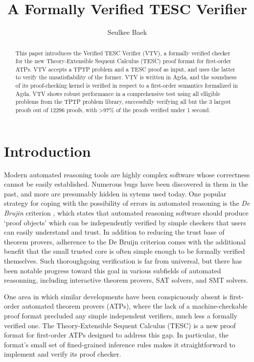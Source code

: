 \documentclass[12pt]{article}
\title{A Formally Verified TESC Verifier}
\author{Seulkee Baek}
\begin{document}
\maketitle

\begin{abstract}

This paper introduces the Verified TESC Verifier (VTV), a formally verified 
checker for the new Theory-Extensible Sequent Calculus (TESC) proof format for first-order ATPs. VTV accepts a
TPTP problem and a TESC proof as input, and uses the latter to verify the 
unsatisfiability of the former. VTV is written in Agda, and the soundness 
of its proof-checking kernel is verified in respect to a first-order
semantics formalized in Agda. VTV shows robust performance in a comprehensive 
test using all elligible problems from the TPTP problem library, 
successfully verifying all but the 3 largest proofs out of 12296 proofs,
with >97\% of the proofs verified under 1 second. 




\end{abstract}


\section{Introduction}

Modern automated reasoning tools are highly complex software whose correctness 
cannot be easily established. Numerous bugs have been discovered in them
in the past, and more are presumably hidden in sytems used today. One popular 
strategy for coping with the possibility of errors in automated reasoning is the 
\textit{De Brujin} criterion \cite{barendregt2005challenge}, which states that 
automated reasoning software should produce `proof objects' which can be 
independently verified by simple checkers that users can easily understand 
and trust. In addition to reducing the trust base of theorem provers, 
adherence to the De Bruijn criterion comes with the additional benefit that the 
small trusted core is often simple enough to be formally verified themselves. 
Such thoroughgoing verification is far from universal, but there has been notable 
progress toward this goal in various subfields of automated reasonning, 
including interactive theorem provers, SAT solvers, and SMT solvers.

One area in which similar developments have been conspicuously absent is 
first-order automated theorem provers (ATPs), where the lack of a machine-checkable
proof format precluded any simple independent verifiers, much less a
formally verified one. The Theory-Extensible Sequent Calculus (TESC) is a new 
proof format for first-order ATPs designed to address this gap. In particular,
the format's small set of fined-grained inference rules makes it 
straightforward to implement and verify its proof checker.
\end{document}

